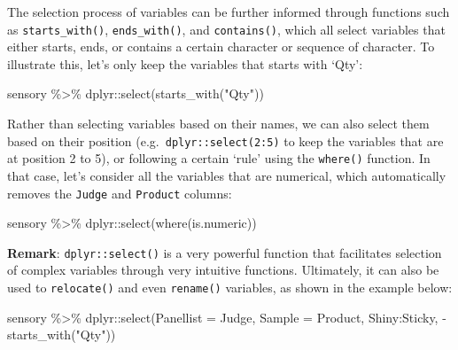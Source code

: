 \documentclass[
]{book}
\newenvironment{Shaded}{\begin{snugshade}}{\end{snugshade}}
\newcommand{\AttributeTok}[1]{\textcolor[rgb]{0.77,0.63,0.00}{#1}}
\newcommand{\FunctionTok}[1]{\textcolor[rgb]{0.00,0.00,0.00}{#1}}
\newcommand{\NormalTok}[1]{#1}
\newcommand{\SpecialCharTok}[1]{\textcolor[rgb]{0.00,0.00,0.00}{#1}}
\newcommand{\StringTok}[1]{\textcolor[rgb]{0.31,0.60,0.02}{#1}}
\begin{document}
The selection process of variables can be further informed through functions such as \texttt{starts\_with()}, \texttt{ends\_with()}, and \texttt{contains()}, which all select variables that either starts, ends, or contains a certain character or sequence of character. To illustrate this, let's only keep the variables that starts with `Qty':

\begin{Shaded}
\begin{Highlighting}[]
\NormalTok{sensory }\SpecialCharTok{\%\textgreater{}\%} 
\NormalTok{  dplyr}\SpecialCharTok{::}\FunctionTok{select}\NormalTok{(}\FunctionTok{starts\_with}\NormalTok{(}\StringTok{"Qty"}\NormalTok{))}
\end{Highlighting}
\end{Shaded}

Rather than selecting variables based on their names, we can also select them based on their position (e.g.~\texttt{dplyr::select(2:5)} to keep the variables that are at position 2 to 5), or following a certain `rule' using the \texttt{where()} function. In that case, let's consider all the variables that are numerical, which automatically removes the \texttt{Judge} and \texttt{Product} columns:

\begin{Shaded}
\begin{Highlighting}[]
\NormalTok{sensory }\SpecialCharTok{\%\textgreater{}\%} 
\NormalTok{  dplyr}\SpecialCharTok{::}\FunctionTok{select}\NormalTok{(}\FunctionTok{where}\NormalTok{(is.numeric))}
\end{Highlighting}
\end{Shaded}

\textbf{Remark}: \texttt{dplyr::select()} is a very powerful function that facilitates selection of complex variables through very intuitive functions. Ultimately, it can also be used to \texttt{relocate()} and even \texttt{rename()} variables, as shown in the example below:

\begin{Shaded}
\begin{Highlighting}[]
\NormalTok{sensory }\SpecialCharTok{\%\textgreater{}\%} 
\NormalTok{  dplyr}\SpecialCharTok{::}\FunctionTok{select}\NormalTok{(}\AttributeTok{Panellist =}\NormalTok{ Judge, }\AttributeTok{Sample =}\NormalTok{ Product, Shiny}\SpecialCharTok{:}\NormalTok{Sticky, }\SpecialCharTok{{-}}\FunctionTok{starts\_with}\NormalTok{(}\StringTok{"Qty"}\NormalTok{))}
\end{Highlighting}
\end{Shaded}
\end{document}
